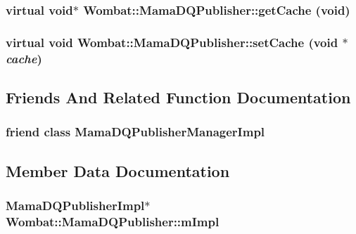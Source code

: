 \label{classWombat_1_1MamaDQPublisher_af4e8c027f5c0655920be2aa7bccad41e}
\hypertarget{classWombat_1_1MamaDQPublisher_a16f6fc4ed53e0d267d98f9d40231f8ab}{
\subsubsection[{getCache}]{\setlength{\rightskip}{0pt plus 5cm}virtual void$\ast$ Wombat::MamaDQPublisher::getCache (void)}}
\label{classWombat_1_1MamaDQPublisher_a16f6fc4ed53e0d267d98f9d40231f8ab}
\hypertarget{classWombat_1_1MamaDQPublisher_aa88420a3d4777258667a413b253bacff}{
\subsubsection[{setCache}]{\setlength{\rightskip}{0pt plus 5cm}virtual void Wombat::MamaDQPublisher::setCache (void $\ast$ {\em cache})}}
\label{classWombat_1_1MamaDQPublisher_aa88420a3d4777258667a413b253bacff}


\subsection{Friends And Related Function Documentation}
\hypertarget{classWombat_1_1MamaDQPublisher_aa6866d6aa7a5d87430a9fdb2663cb3b8}{
\subsubsection[{MamaDQPublisherManagerImpl}]{\setlength{\rightskip}{0pt plus 5cm}friend class MamaDQPublisherManagerImpl}}
\label{classWombat_1_1MamaDQPublisher_aa6866d6aa7a5d87430a9fdb2663cb3b8}


\subsection{Member Data Documentation}
\hypertarget{classWombat_1_1MamaDQPublisher_a9856c401cd166cfc6c3e6ecc10a4812b}{
\subsubsection[{mImpl}]{\setlength{\rightskip}{0pt plus 5cm}MamaDQPublisherImpl$\ast$ {\bf Wombat::MamaDQPublisher::mImpl}}}
\label{classWombat_1_1MamaDQPublisher_a9856c401cd166cfc6c3e6ecc10a4812b}
